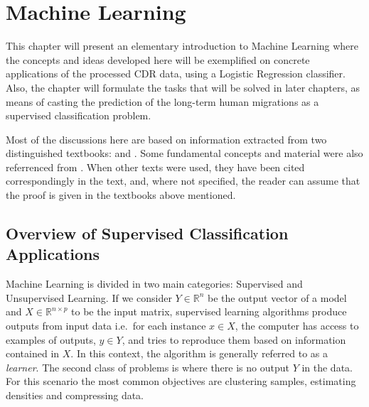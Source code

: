 

\chapter{Machine Learning}\label{ch:machineLearning}

This chapter will present an elementary introduction to Machine Learning where the concepts and ideas developed here will be exemplified on concrete applications of the processed CDR data, using a Logistic Regression classifier.
Also, the chapter will formulate the tasks that will be solved in later chapters, as means of casting the prediction of the long-term human migrations as a supervised classification problem.

Most of the discussions here are based on information extracted from two distinguished textbooks: \citep{bishop-patternRecognition} and \citep{hastie-elemstatslearn}.
Some fundamental concepts and material were also referrenced from \citep{scikit-learn}.
When other texts were used, they have been cited correspondingly in the text, and, where not specified, the reader can assume that the proof is given in the textbooks above mentioned.

\section{Overview of Supervised Classification Applications}\label{section-supervised-learning}


Machine Learning is divided in two main categories: Supervised and Unsupervised Learning.
If we consider $Y \in \mathbb{R}^n$ be the output vector of a model and $X \in \mathbb{R}^{n \times p}$ to be the input matrix, supervised learning algorithms produce outputs from input data i.e.\ for each instance $x \in X$, the computer has access to examples of outputs, $y \in Y$, and tries to reproduce them based on information contained in $X$.
In this context, the algorithm is generally referred to as a \textit{learner}.
The second class of problems is where there is no output $Y$ in the data.
For this scenario the most common objectives are clustering samples, estimating densities and compressing data.

